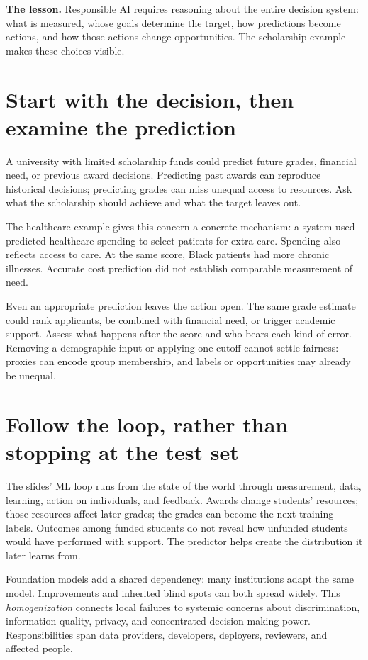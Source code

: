 \documentclass[11pt,letterpaper]{article}
\begin{document}

\textbf{The lesson.} Responsible AI requires reasoning about the entire decision
system: what is measured, whose goals determine the target, how predictions become
actions, and how those actions change opportunities. The scholarship example makes
these choices visible.

\section*{Start with the decision, then examine the prediction}
A university with limited scholarship funds could predict future grades, financial
need, or previous award decisions. Predicting past awards can reproduce historical
decisions; predicting grades can miss unequal access to resources. Ask what the
scholarship should achieve and what the target leaves out.

The healthcare example gives this concern a concrete mechanism: a system used
predicted healthcare spending to select patients for extra care. Spending also
reflects access to care. At the same score, Black patients had more chronic
illnesses. Accurate cost prediction did not establish comparable measurement of need.

Even an appropriate prediction leaves the action open. The same grade estimate
could rank applicants, be combined with financial need, or trigger academic support.
Assess what happens after the score and who bears each kind of error. Removing a
demographic input or applying one cutoff cannot settle fairness: proxies can encode
group membership, and labels or opportunities may already be unequal.

\section*{Follow the loop, rather than stopping at the test set}
The slides' ML loop runs from the state of the world through measurement, data,
learning, action on individuals, and feedback. Awards change students' resources;
those resources affect later
grades; the grades can become the next training labels. Outcomes among funded
students do not reveal how unfunded students would have performed with support.
The predictor helps create the distribution it later learns from.

Foundation models add a shared dependency: many institutions adapt the same model.
Improvements and inherited blind spots can both spread widely. This
\emph{homogenization} connects local failures to systemic concerns about
discrimination, information quality, privacy, and concentrated decision-making power.
Responsibilities span data providers, developers, deployers, reviewers, and affected people.
\end{document}
